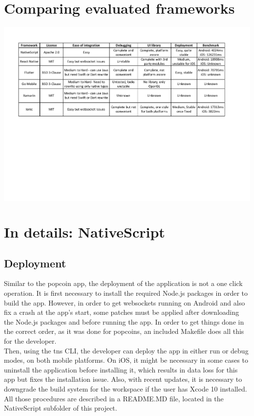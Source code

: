\documentclass[11pt, a4paper, twoside, openright]{article} %
\begin{document}
{\section{Comparing evaluated frameworks}
\label{sec:summary_table}
\hspace{-1cm}
\includegraphics[scale=0.6]{frameworkComparison.pdf}

\section{In details: NativeScript}
\subsection{Deployment}
\label{sub:appendix_nativescript_deployment}
Similar to the popcoin app, the deployment of the application is not a one click operation. It is first necessary to install the required Node.js packages in order to build the app. However, in order to get websockets running on Android and also fix a crash at the app's start, some patches must be applied after downloading the Node.js packages and before running the app. In order to get things done in the correct order, as it was done for popcoins, an included Makefile does all this for the developer. \\
Then, using the tns CLI, the developer can deploy the app in either run or debug modes, on both mobile platforms. On iOS, it might be necessary in some cases to uninstall the application before installing it, which results in data loss for this app but fixes the installation issue. Also, with recent updates, it is necessary to downgrade the build system for the workspace if the user has Xcode 10 installed. \\
All those procedures are described in a README.MD file, located in the NativeScript subfolder of this project.\\

}
\end{document}
